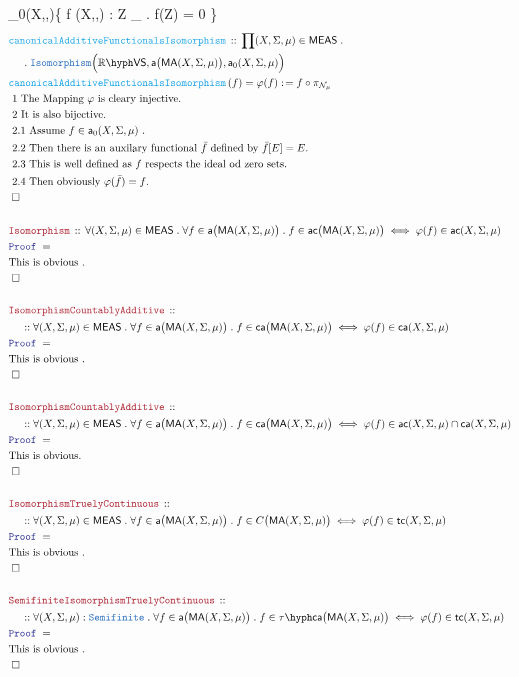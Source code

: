 \documentclass[12pt]{scrartcl}
\newcommand{\TYPE}[1]{\textcolor{NavyBlue}{\mathtt{#1}}}
\newcommand{\FUNC}[1]{\textcolor{Cerulean}{\mathtt{#1}}}
\newcommand{\LOGIC}[1]{\textcolor{Blue}{\mathtt{#1}}}
\newcommand{\THM}[1]{\textcolor{Maroon}{\mathtt{#1}}}
\renewcommand{\.}{\; . \;}
\newcommand{\de}{: \kern 0.1pc =}
\newcommand{\Act}[1]{\left( #1 \right)}
\newcommand{\Theorem}[2]{& \THM{#1} \, :: \, #2 \\ & \Proof = \\ }
\newcommand{\DeclareFunc}[2]{& \FUNC{#1} \, :: \, #2 \\}
\newcommand{\DefineNamedFunc}[4]{&  \FUNC{#1}\Act{#2} = #3 \de #4 \\}
\newcommand{\NewLine}{\\ & \kern 1pc}
\newcommand{\Page}[1]{ \begin{align*} #1 \end{align*}   }
\newcommand{\Reals}{\mathbb{R} }
\newcommand{\QED}{\; \square}
\newcommand{\EndProof}{& \QED \\}
\newcommand{\Proof}{\LOGIC{Proof} \; }
\newcommand{\Explain}[1]{& \text{#1.} \\}
\newcommand{\VS}[1]{#1\hyph\mathsf{VS}} %
\newcommand{\Null}{\mathcal{N}}
\newcommand{\Semifinite}{\TYPE{Semifinite}}
\newcommand{\MEAS}{\mathsf{MEAS}}
\newcommand{\caf}{\mathsf{ca}}
\newcommand{\af}{\mathsf{a}}
\newcommand{\ac}{\mathsf{ac}}
\newcommand{\tc}{\mathsf{tc}}
\newcommand{\ma}{\mathsf{MA}}
\newcommand{\Caf}{\tau\hyph\mathsf{ca}}
\begin{document}
{	{\af_0(X,\Sigma,\mu)}{\{ f \in \af(X,\Sigma,\mu) : \forall Z \in \Null_\mu \. f(Z) = 0 \}}
}\Page{
	\DeclareFunc{canonicalAdditiveFunctionalsIsomorphism}
	{
		\prod (X,\Sigma,\mu) \in \MEAS \.   \NewLine \.
		\TYPE{Isomorphism}\Big( \VS{\Reals}, \af\big( \ma(X,\Sigma,\mu) \big), \af_0(X,\Sigma,\mu) \Big)	
	}
	\DefineNamedFunc{canonicalAdditiveFunctionalsIsomorphism}{f}
	{\varphi(f)}{  f \circ \pi_{\Null_\mu} }
	\Explain{ 1 The Mapping $\varphi$ is cleary injective}
	\Explain{ 2 It is also bijective}
	\Explain{ 2.1 Assume $f \in \af_0(X,\Sigma,\mu) $ }
	\Explain{ 2.2 Then there is an auxilary functional $\bar f$ 
		defined by $\bar f [E] = E$}
	\Explain{ 2.3 This is well defined as $f$ respects the ideal od zero sets}
	\Explain{ 2.4 Then obviously $\varphi(\bar f) = f$}
	\EndProof
	\\
	\Theorem{Isomorphism}
	{
		\forall (X,\Sigma,\mu) \in \MEAS \.
		\forall f \in \af\big(\ma(X,\Sigma,\mu) \big) \.
		f \in \ac\big(\ma(X,\Sigma,\mu) \big) \iff
		\varphi(f) \in \ac(X,\Sigma,\mu) 
	}
	\Explain{This is obvious }
	\EndProof
	\\
	\Theorem{IsomorphismCountablyAdditive}
	{
		\NewLine ::		
		\forall (X,\Sigma,\mu) \in \MEAS \.
		\forall f \in \af\big(\ma(X,\Sigma,\mu) \big) \.
		f \in \caf\big(\ma(X,\Sigma,\mu) \big) \iff
		\varphi(f) \in \caf(X,\Sigma,\mu) 
	}
	\Explain{This is obvious }
	\EndProof
	\\
	\Theorem{IsomorphismCountablyAdditive}
	{
		\NewLine ::		
		\forall (X,\Sigma,\mu) \in \MEAS \.
		\forall f \in \af\big(\ma(X,\Sigma,\mu) \big) \.
		f \in \caf\big(\ma(X,\Sigma,\mu) \big) \iff
		\varphi(f) \in \ac(X,\Sigma,\mu) \cap \caf(X,\Sigma,\mu) 
	}
	\Explain{This is obvious}
	\EndProof
	\\
	\Theorem{IsomorphismTruelyContinuous}
	{
		\NewLine ::		
		\forall (X,\Sigma,\mu) \in \MEAS \.
		\forall f \in \af\big(\ma(X,\Sigma,\mu) \big) \.
		f \in C\big(\ma(X,\Sigma,\mu) \big) \iff
		\varphi(f) \in \tc(X,\Sigma,\mu) 
	}
	\Explain{This is obvious }
	\EndProof
	\\
	\Theorem{SemifiniteIsomorphismTruelyContinuous}
	{
		\NewLine ::		
		\forall (X,\Sigma,\mu) : \Semifinite \.
		\forall f \in \af\big(\ma(X,\Sigma,\mu) \big) \.
		f \in \Caf\big(\ma(X,\Sigma,\mu) \big) \iff
		\varphi(f) \in \tc(X,\Sigma,\mu) 
	}
	\Explain{This is obvious }
	\EndProof
}
\newpage
\end{document}
